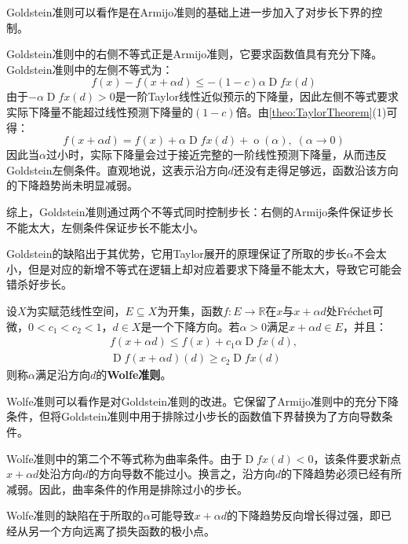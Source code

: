 \begin{note}
	Goldstein准则可以看作是在Armijo准则的基础上进一步加入了对步长下界的控制。\par
	Goldstein准则中的右侧不等式正是Armijo准则，它要求函数值具有充分下降。Goldstein准则中的左侧不等式为：
	\begin{equation*}
		f(x)-f(x+\alpha d)
		\leqslant
		-(1-c)\alpha\operatorname{D}fx(d)
	\end{equation*}
	由于$-\alpha\operatorname{D}fx(d)>0$是一阶Taylor线性近似预示的下降量，因此左侧不等式要求实际下降量不能超过线性预测下降量的$(1-c)$倍。由\cref{theo:TaylorTheorem}(1)可得：
	\begin{equation*}
		f(x+\alpha d)=f(x)+\alpha\operatorname{D}fx(d)+\operatorname{o}(\alpha),\;(\alpha\to0)
	\end{equation*}
	因此当$\alpha$过小时，实际下降量会过于接近完整的一阶线性预测下降量，从而违反Goldstein左侧条件。直观地说，这表示沿方向$d$还没有走得足够远，函数沿该方向的下降趋势尚未明显减弱。\par
	综上，Goldstein准则通过两个不等式同时控制步长：右侧的Armijo条件保证步长不能太大，左侧条件保证步长不能太小。\par
	Goldstein的缺陷出于其优势，它用Taylor展开的原理保证了所取的步长$\alpha$不会太小，但是对应的新增不等式在逻辑上却对应着要求下降量不能太大，导致它可能会错杀好步长。
\end{note}
\begin{definition}
	设$X$为实赋范线性空间，$E\subseteq X$为开集，函数$f:E\to\mathbb{R}$在$x$与$x+\alpha d$处Fr\'echet可微，$0<c_1<c_2<1$，$d\in X$是一个下降方向。若$\alpha>0$满足$x+\alpha d\in E$，并且：
	\begin{gather*}
		f(x+\alpha d)\leqslant
		f(x)+c_1\alpha\operatorname{D}fx(d),\\
		\operatorname{D}f(x+\alpha d)(d)\geqslant c_2\operatorname{D}fx(d)
	\end{gather*}
	则称$\alpha$满足沿方向$d$的\textbf{Wolfe准则}。
\end{definition}
\begin{note}
	Wolfe准则可以看作是对Goldstein准则的改进。它保留了Armijo准则中的充分下降条件，但将Goldstein准则中用于排除过小步长的函数值下界替换为了方向导数条件。\par
	Wolfe准则中的第二个不等式称为曲率条件。由于$\operatorname{D}fx(d)<0$，该条件要求新点$x+\alpha d$处沿方向$d$的方向导数不能过小。换言之，沿方向$d$的下降趋势必须已经有所减弱。因此，曲率条件的作用是排除过小的步长。\par
	Wolfe准则的缺陷在于所取的$\alpha$可能导致$x+\alpha d$的下降趋势反向增长得过强，即已经从另一个方向远离了损失函数的极小点。
\end{note}
